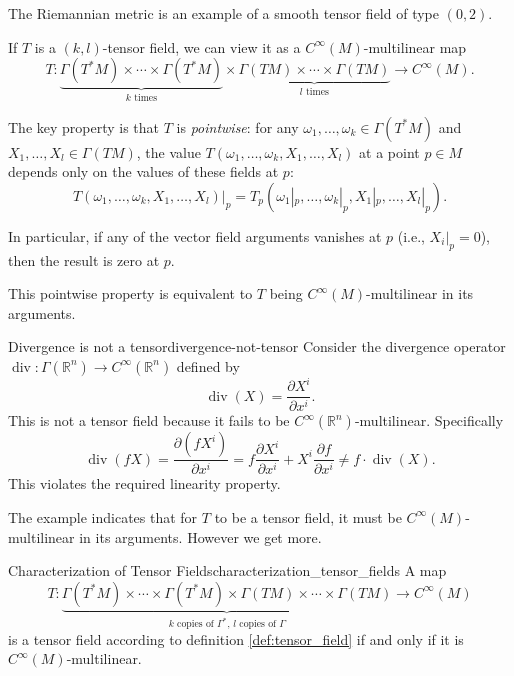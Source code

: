 The Riemannian metric is an example of a smooth tensor field of type $(0, 2)$.

\begin{colremark}
If $T$ is a $(k, l)$-tensor field, we can view it as a $C^\infty(M)$-multilinear map
\[
T: \underbrace{\Gamma(T^*M) \times \cdots \times \Gamma(T^*M)}_{k \text{ times}} \times \underbrace{\Gamma(TM) \times \cdots \times \Gamma(TM)}_{l \text{ times}} \longrightarrow C^\infty(M).
\]

The key property is that $T$ is \emph{pointwise}: for any $\omega_1, \dots, \omega_k \in \Gamma(T^*M)$ and $X_1, \dots, X_l \in \Gamma(TM)$, the value $T(\omega_1, \dots, \omega_k, X_1, \dots, X_l)$ at a point $p \in M$ depends only on the values of these fields at $p$:
\[
T(\omega_1, \dots, \omega_k, X_1, \dots, X_l)|_p = T_p(\omega_1|_p, \dots, \omega_k|_p, X_1|_p, \dots, X_l|_p).
\]

In particular, if any of the vector field arguments vanishes at $p$ (i.e., $X_i|_p = 0$), then the result is zero at $p$.

This pointwise property is equivalent to $T$ being $C^\infty(M)$-multilinear in its arguments.
\end{colremark}

\begin{colexample}{Divergence is not a tensor}{divergence-not-tensor}
Consider the divergence operator $\operatorname{div}: \Gamma(\mathbb{R}^n) \to C^\infty(\mathbb{R}^n)$ defined by
\[
\operatorname{div}(X) = \frac{\partial X^i}{\partial x^i}.
\]
This is not a tensor field because it fails to be $C^\infty(\mathbb{R}^n)$-multilinear. Specifically
\[
\operatorname{div}(fX) = \frac{\partial (fX^i)}{\partial x^i} = f \frac{\partial X^i}{\partial x^i} + X^i \frac{\partial f}{\partial x^i} \neq f \cdot \operatorname{div}(X).
\]
This violates the required linearity property.
\end{colexample}

The example indicates that for $T$ to be a tensor field, it must be $C^\infty(M)$-multilinear in its arguments. However we get more.

\begin{colortheo}{Characterization of Tensor Fields}{characterization_tensor_fields}
A map
$$T: \underbrace{\Gamma(T^*M) \times \cdots \times \Gamma(T^*M) \times \Gamma(TM) \times \cdots \times \Gamma(TM)}_{\text{$k$ copies of $\Gamma^*$, $l$ copies of $\Gamma$}} \longrightarrow C^\infty(M)$$
is a tensor field according to definition \ref{def:tensor_field} if and only if it is $C^\infty(M)$-multilinear.
\end{colortheo}

